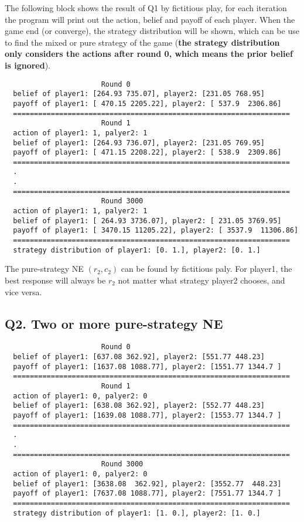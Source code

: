 \documentclass[a4paper, oneside, final, 12pt]{scrartcl} %
\begin{document}
The following block shows the result of Q1 by fictitious play, 
for each iteration the program will print out the action, belief and payoff of each player.
When the game end (or converge), the strategy distribution will be shown,
which can be use to find the mixed or pure strategy of the game
(\textbf{the strategy distribution only considers the actions after round 0, 
which means the prior belief is ignored}).

\begin{lstlisting}
                       Round 0
  belief of player1: [264.93 735.07], player2: [231.05 768.95]
  payoff of player1: [ 470.15 2205.22], player2: [ 537.9  2306.86]
  ==================================================================
                       Round 1
  action of player1: 1, palyer2: 1
  belief of player1: [264.93 736.07], player2: [231.05 769.95]
  payoff of player1: [ 471.15 2208.22], player2: [ 538.9  2309.86]
  ==================================================================
  .
  .
  ==================================================================
                       Round 3000
  action of player1: 1, palyer2: 1
  belief of player1: [ 264.93 3736.07], player2: [ 231.05 3769.95]
  payoff of player1: [ 3470.15 11205.22], player2: [ 3537.9  11306.86]
  ==================================================================
  strategy distribution of player1: [0. 1.], player2: [0. 1.]
\end{lstlisting}

\begingroup
\raggedright
The pure-strategy NE $(r_2, c_2)$ can be found by fictitious paly.
For player1, the best response will always be $r_2$ 
not matter what strategy player2 chooses, and vice versa.
\endgroup

\subsection{Q2. Two or more pure-strategy NE}

\begin{lstlisting}
                       Round 0
  belief of player1: [637.08 362.92], player2: [551.77 448.23]
  payoff of player1: [1637.08 1088.77], player2: [1551.77 1344.7 ]
  ==================================================================
                       Round 1
  action of player1: 0, palyer2: 0
  belief of player1: [638.08 362.92], player2: [552.77 448.23]
  payoff of player1: [1639.08 1088.77], player2: [1553.77 1344.7 ]
  ==================================================================
  .
  .
  ==================================================================
                       Round 3000
  action of player1: 0, palyer2: 0
  belief of player1: [3638.08  362.92], player2: [3552.77  448.23]
  payoff of player1: [7637.08 1088.77], player2: [7551.77 1344.7 ]
  ==================================================================
  strategy distribution of player1: [1. 0.], player2: [1. 0.]
\end{lstlisting}
\end{document}
